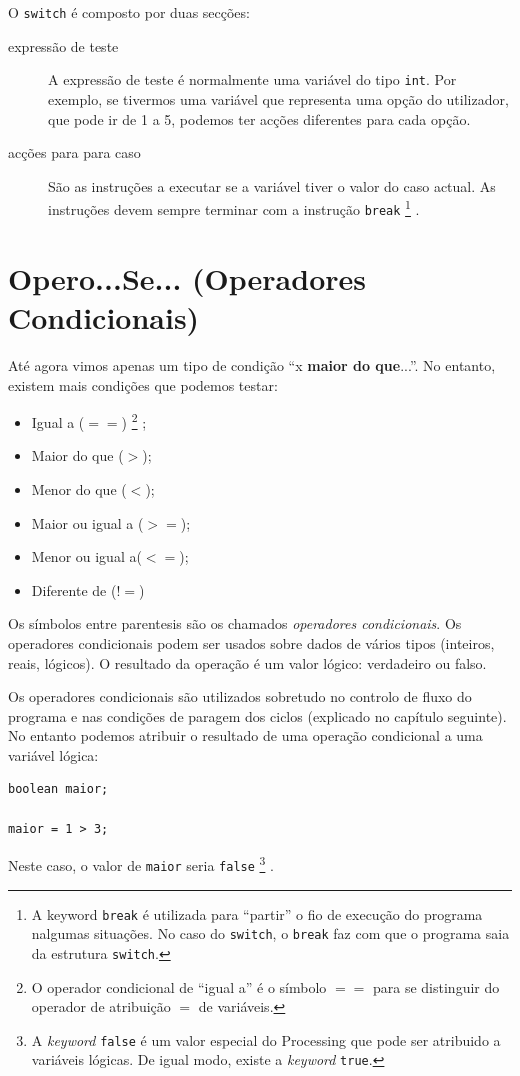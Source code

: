 O \texttt{switch} é composto por duas secções:
\begin{description}
\item[expressão de teste] 
A expressão de teste é normalmente uma variável do tipo \texttt{int}. Por exemplo, se tivermos uma variável que representa uma opção do utilizador, que pode ir de 1 a 5, podemos ter acções diferentes para cada opção.
	
\item[acções para para caso]
São as instruções a executar se a variável tiver o valor do caso actual. As instruções devem sempre terminar com a instrução \texttt{break}%
\footnote{A keyword \texttt{break} é utilizada para ``partir'' o fio de execução do programa nalgumas situações. No caso do \texttt{switch}, o \texttt{break} faz com que o programa saia da estrutura \texttt{switch}.}%
.
\end{description}



\section{Opero...Se... (Operadores Condicionais)}

Até agora vimos apenas um tipo de condição ``x \textbf{maior do que}...''. No entanto, existem mais condições que podemos testar:
\begin{itemize}
\item Igual a ($==$)%
\footnote{O operador condicional de ``igual a'' é o símbolo $==$ para se distinguir do operador de atribuição $=$ de variáveis.}%
;
\item Maior do que ($>$);
\item Menor do que ($<$);
\item Maior ou igual a ($>=$);
\item Menor ou igual a($<=$);
\item Diferente de ($!=$)
\end{itemize}

Os símbolos entre parentesis são os chamados \emph{operadores condicionais}.
Os operadores condicionais podem ser usados sobre dados de vários tipos (inteiros, reais, lógicos). O resultado da operação é um valor lógico: verdadeiro ou falso.

Os operadores condicionais são utilizados sobretudo no controlo de fluxo do programa e nas condições 
de paragem dos ciclos (explicado no capítulo seguinte). No entanto podemos atribuir o resultado de uma operação
condicional a uma variável lógica:
\begin{lstlisting}
boolean maior;

maior = 1 > 3;
\end{lstlisting}
Neste caso, o valor de \texttt{maior} seria \texttt{false}%
\footnote{A \emph{keyword} \texttt{false} é um valor especial do Processing que pode ser atribuido a variáveis lógicas. De igual modo, existe a \emph{keyword} \texttt{true}.}%
.

